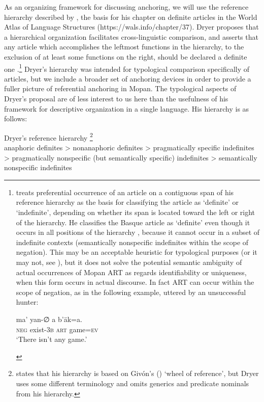 \documentclass[output=paper]{langsci/langscibook}
\begin{document}
As an organizing framework for discussing anchoring, we will use the reference hierarchy described by \cite[][e235]{dryer:14}, the basis for his chapter on definite articles in the World Atlas of Language Structures (https://wals.info/chapter/37).  Dryer proposes that a hierarchical organization facilitates cross-linguistic comparison, and asserts that any article which accomplishes the leftmost functions in the hierarchy, to the exclusion of at least some functions on the right, should be declared a definite one \citep[][e241]{dryer:14}.\footnote{\cite[][e237-238]{dryer:14} treats preferential occurrence of an article on a contiguous span of his reference hierarchy as the basis for classifying the article as `definite' or `indefinite', depending on whether its span is located toward the left or right of the hierarchy.  He classifies the Basque article as `definite' even though it occurs in all positions of the hierarchy \citep[][e239]{dryer:14}, because it cannot occur in a subset of indefinite contexts (semantically nonspecific indefinites within the scope of negation).  This may be an acceptable heuristic for typological purposes (or it may not, see \citealt{contini:morava:danziger:fc}), but it does not solve the potential semantic ambiguity of actual occurrences of Mopan ART as regards identifiability or uniqueness, when this form occurs in actual discourse. In fact ART can occur within the scope of negation, as in the following example, uttered by an unsuccessful hunter:

\begin{exe}
\exi{}
\gll 	ma' 		yan-{∅}	 	a 	b'\"ak=a. \\
	{\textsc{neg}}	exist-{\textsc{3b}}	{\textsc{art}}	game{\textsc{=ev}} \\
\glt 	`There isn't any game.'
\end{exe}
} 
Dryer's hierarchy was intended for typological comparison specifically of articles, but we include a broader set of anchoring devices in order to provide a fuller picture of referential anchoring in Mopan. The typological aspects of Dryer's proposal are of less interest to us here than the usefulness of his framework for descriptive organization in a single language.  His hierarchy is as follows:

\begin{exe}
\exi{}
Dryer's reference hierarchy \citep[][e235]{dryer:14}\footnote{{\cite[][e235]{dryer:14} states that his hierarchy is based on Giv\'on's (\citeyear{givon:78}) `wheel of reference', but Dryer uses some different terminology and omits generics and predicate nominals from his hierarchy.}} \\
anaphoric definites > nonanaphoric definites > pragmatically specific indefinites > pragmatically nonspecific (but semantically specific) indefinites > semantically nonspecific indefinites
\end{exe}
\end{document}
